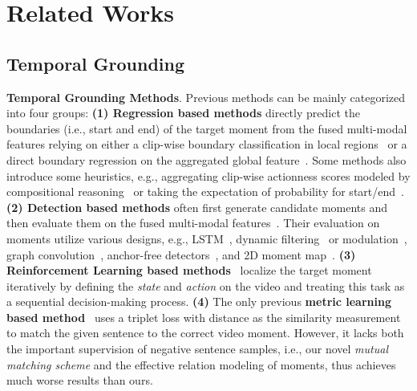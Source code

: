 \documentclass[letterpaper]{article} \usepackage{aaai22}  \usepackage{times}  \usepackage{helvet}  \usepackage{courier}  \usepackage[hyphens]{url}  \usepackage{graphicx} \urlstyle{rm} \def\UrlFont{\rm}  \usepackage{natbib}  \usepackage{caption} \DeclareCaptionStyle{ruled}{labelfont=normalfont,labelsep=colon,strut=off} \frenchspacing  \setlength{\pdfpagewidth}{8.5in}  \setlength{\pdfpageheight}{11in}  \usepackage{algorithm}
\begin{document}
\section{Related Works}
\subsection{Temporal Grounding}
\noindent\textbf{Temporal Grounding Methods}. Previous methods can be mainly categorized into four groups: \textbf{(1) Regression based methods} directly predict the boundaries (i.e., start and end) of the target moment from the fused multi-modal features relying on either a clip-wise boundary classification in local regions~\cite{DBLP:conf/naacl/GhoshAPH19,DBLP:conf/wacv/OpazoMSLG20, DBLP:conf/acl/ZhangSJZ20,DBLP:conf/aaai/ChenLTXZTL20} or a direct boundary regression on the aggregated global feature~\cite{DBLP:conf/aaai/YuanM019,DBLP:conf/aaai/Wang0J20,DBLP:conf/cvpr/MunCH20}. Some methods also introduce some heuristics, e.g., aggregating clip-wise actionness scores modeled by compositional reasoning~\cite{DBLP:conf/eccv/LiuYCHFN18} or taking the expectation of probability for start/end~\cite{DBLP:conf/naacl/GhoshAPH19}. \textbf{(2) Detection based methods} often first generate candidate moments and then evaluate them on the fused multi-modal features~\cite{DBLP:conf/iccv/GaoSYN17, DBLP:conf/wacv/GeGCN19}. Their evaluation on moments utilize various designs, e.g., LSTM~\cite{DBLP:conf/emnlp/ChenCMJC18,DBLP:conf/aaai/Xu0PSSS19}, dynamic filtering~\cite{DBLP:conf/cvpr/ZhangDWWD19,DBLP:conf/wacv/OpazoMSLG20} or modulation~\cite{DBLP:conf/nips/YuanMWL019}, graph convolution~\cite{DBLP:conf/cvpr/ZhangDWWD19}, anchor-free detectors~\cite{DBLP:conf/emnlp/LuCTLX19,DBLP:conf/cvpr/ZengXHCTG20}, and 2D moment map~\cite{DBLP:conf/aaai/ZhangPFL20}.  \textbf{(3) Reinforcement Learning based methods}~\cite{DBLP:conf/aaai/HeZHLLW19,DBLP:conf/cvpr/WangHW19,DBLP:conf/aaai/WuLLL20} localize the target moment iteratively by defining the {\em state} and {\em action} on the video and treating this task as a sequential decision-making process. \textbf{(4)} The only previous \textbf{metric learning based method}~\cite{DBLP:conf/iccv/HendricksWSSDR17} uses a triplet loss with  distance as the similarity measurement to match the given sentence to the correct video moment. However, it lacks both the important supervision of negative sentence samples, i.e., our novel {\em mutual matching scheme} and the effective relation modeling of moments, thus achieves much worse results than ours.
\end{document}
